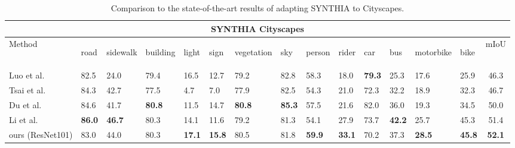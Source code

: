 \documentclass[10pt,twocolumn,letterpaper]{article}
\begin{document}
\begin{table*}[t!]
\caption{Comparison to the state-of-the-art results of adapting SYNTHIA to Cityscapes. }
\small
\begin{center}
\begin{tabular}{ l|p{0.62cm}p{0.62cm}p{0.62cm}p{0.62cm}p{0.62cm}p{0.62cm}p{0.62cm}p{0.62cm}p{0.62cm}p{0.62cm}p{0.62cm}p{0.62cm}p{0.62cm}c }
 \toprule
 \multicolumn{15}{c}{SYNTHIA  Cityscapes} \\
 \midrule
Method & \begin{turn}{45}road\end{turn}
& \begin{turn}{45}sidewalk\end{turn}& \begin{turn}{45}building\end{turn}& \begin{turn}{45}light\end{turn}& \begin{turn}{45}sign\end{turn}& \begin{turn}{45}vegetation\end{turn}& \begin{turn}{45}sky\end{turn}& \begin{turn}{45}person\end{turn}& \begin{turn}{45}rider\end{turn}& \begin{turn}{45}car\end{turn}& \begin{turn}{45}bus\end{turn}&  \begin{turn}{45}motorbike\end{turn}& \begin{turn}{45}bike\end{turn}& mIoU
\\
\midrule
Luo et al. \cite{Luo_2019_CVPR} &82.5 &24.0& 79.4& 16.5& 12.7& 79.2& 82.8& 58.3& 18.0& \textbf{79.3}& 25.3& 17.6& 25.9& 46.3 
\\
Tsai et al.\cite{outputspace}&84.3& 42.7& 77.5& 4.7& 7.0& 77.9& 82.5& 54.3& 21.0& 72.3& 32.2& 18.9& 32.3& 46.7
\\
Du et al. \cite{Du_2019_ICCV}& 84.6& 41.7& \textbf{80.8}& 11.5& 14.7& \textbf{80.8}& \textbf{85.3}& 57.5& 21.6& 82.0& 36.0& 19.3& 34.5& 50.0
\\
Li et al. \cite{bidir} &\textbf{86.0}& \textbf{46.7}& 80.3& 14.1& 11.6& 79.2& 81.3& 54.1& 27.9& 73.7& \textbf{42.2}& 25.7& 45.3& 51.4
\\
\midrule
ours (ResNet101) &83.0&44.0&80.3&\textbf{17.1}&\textbf{15.8}&80.5&81.8&\textbf{59.9}&\textbf{33.1}&70.2&37.3&\textbf{28.5}&\textbf{45.8}&\textbf{52.1}
\\
\bottomrule

\end{tabular}
\end{center}
\label{syn2city}
\vspace{-5mm}
\end{table*}
\end{document}
